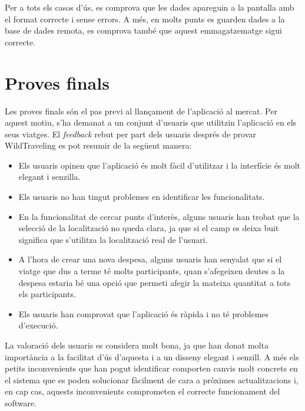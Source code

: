 Per a tots els casos d'ús, es comprova que les dades apareguin a la pantalla amb el format correcte i sense errors. A més, en molts punts es guarden dades a la base de dades remota, es comprova també que aquest emmagatzematge sigui correcte.

\section{Proves finals}

Les proves finals són el pas previ al llançament de l'aplicació al mercat. Per aquest motiu, s'ha demanat a un conjunt d'usuaris que utilitzin l'aplicació en els seus viatges. El \textit{feedback} rebut per part dels usuaris després de provar WildTraveling es pot resumir de la següent manera:
\begin{itemize}
\item{}Els usuaris opinen que l'aplicació és molt fàcil d'utilitzar i la interfície és molt elegant i senzilla.
\item{}Els usuaris no han tingut problemes en identificar les funcionalitats.
\item{}En la funcionalitat de cercar punts d'interès, alguns usuaris han trobat que la selecció de la localització no queda clara, ja que si el camp es deixa buit significa que s'utilitza la localització real de l'usuari.
\item{}A l'hora de crear una nova despesa, alguns usuaris han senyalat que si el viatge que dus a terme té molts participants, quan s'afegeixen deutes a la despesa estaria bé una opció que permeti afegir la mateixa quantitat a tots els participants.
\item{}Els usuaris han comprovat que l'aplicació és ràpida i no té problemes d'execució.
\end{itemize}

La valoració dels usuaris es considera molt bona, ja que han donat molta importància a la facilitat d'ús d'aquesta i a un disseny elegant i senzill. A més els petits inconvenients que han pogut identificar comporten canvis molt concrets en el sistema que es poden solucionar fàcilment de cara a pròximes actualitzacions i, en cap cas, aquests inconvenients comprometen el correcte funcionament del software.